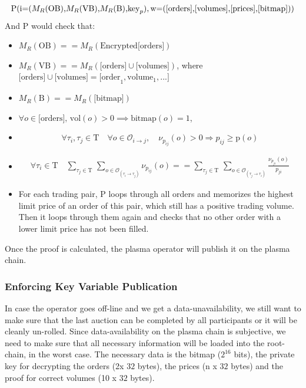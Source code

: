 \documentclass[11pt,parskip=full]{scrartcl}%
\newcommand{\Tau}{\mathrm{T}}
\def\pO{\mathcal{O}}
\def\ra{\rightarrow}
\begin{document}
\begin{equation}
\text{P(i=(}M_R\text{(OB),}M_R\text{(VB),}M_R\text{(B),} \text{key}_p),\\
\text{w=([orders],[volumes],[prices],[bitmap]))} 
\end{equation}
And P would check that:
\begin{itemize}
\item  $M_R(\text{OB}) == M_R(\text{Encrypted[orders]})$
\item  $M_R(\text{VB}) == M_R(\text{[orders]} \cup \text{[volumes]})$,\newline
where $\text{[orders]} \cup \text{[volumes]} = \text{[order}_1, \text{volume}_1, ...] $
\item $ M_R(\text{B}) == M_R(\text{[bitmap]})$
\item $\forall o \in \text{[orders], vol}(o)>0 \implies \text{bitmap}(o) = 1 $, 

\item 
\begin{equation}  \forall \tau_i ,\tau_j \in \Tau \quad \forall o \in \pO_{i\ra j}, \quad \nu_{p_{ij}}(o)>0 \Rightarrow p_{ij}\geq \text{p}(o)
\end{equation}
\item 
\begin{equation}
\begin{split}
\forall \tau_i \in \Tau \quad \sum_{\tau_j\in \Tau} \,
\sum_{ o\in \pO_{(\tau_i \rightarrow \tau_j)}} \nu_{p_{ij}}(o) == \sum_{\tau_j\in \Tau} \, \sum_{o\in \pO_{(\tau_j\rightarrow \tau_i)}} \frac{\nu_{p_{ji}}(o)}{p_{ji}}
\end{split}
\end{equation}
\item For each trading pair, P loops through all orders and memorizes the highest limit price of an order of this pair, which still has a positive trading volume. 
Then it loops through them again and checks that no other order with a lower limit price has not been filled. 
\end{itemize}

Once the proof is calculated, the plasma operator will publish it on the plasma chain. 


\subsubsection{Enforcing Key Variable Publication}

\label{enforceAvailablity}
In case the operator goes off-line and we get a data-unavailability, we still want to make sure that the last auction can be completed by all participants or it will be cleanly un-rolled. 
Since data-availability on the plasma chain is subjective, we need to make sure that all necessary information will be loaded into the root-chain, in the worst case. 
The necessary data is the bitmap ($2^{16}$ bits), the private key for decrypting the orders (2x $32$ bytes), the prices (n x $32$ bytes) and the proof for correct volumes (10 x $32$ bytes).
\end{document}
